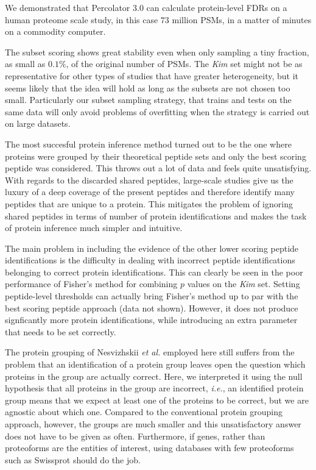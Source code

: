 \documentclass{article}
\begin{document}
We demonstrated that Percolator 3.0 can calculate protein-level FDRs
on a human proteome scale study, in this case $73$ million PSMs, in a
matter of minutes on a commodity computer.

The subset scoring shows great stability even when only sampling a
tiny fraction, as small as $0.1\%$, of the original number of PSMs.
The {\em Kim} set might not be as representative for other types of
studies that have greater heterogeneity, but it seems likely that the
idea will hold as long as the subsets are not chosen too small.
Particularly our subset sampling strategy, that trains and tests on
the same data will only avoid problems of overfitting when the
strategy is carried out on large datasets.

The most succesful protein inference method turned out to be the one
where proteins were grouped by their theoretical peptide sets and only
the best scoring peptide was considered. This throws out a lot of data
and feels quite unsatisfying. With regards to the discarded shared
peptides, large-scale studies give us the luxury of a deep coverage of
the present peptides and therefore identify many peptides that
are unique to a protein. This mitigates the problem of ignoring shared
peptides in terms of number of protein identifications and makes the
task of protein inference much simpler and intuitive.

The main problem in including the evidence of the other lower scoring
peptide identifications is the difficulty in dealing with incorrect
peptide identifications belonging to correct protein identifications.
This can clearly be seen in the poor performance of Fisher's method
for combining $p$ values on the {\em Kim} set. Setting
peptide-level thresholds can actually bring Fisher's method up to par
with the best scoring peptide approach (data not shown). However,
it does not produce signficantly more protein identifications,
while introducing an extra parameter that needs to be set correctly.

The protein grouping of Nesvizhskii {\em et al.} employed here still
suffers from the problem that an identification of a protein group
leaves open the question which proteins in the group are actually
correct. Here, we interpreted it using the null hypothesis that all
proteins in the group are incorrect, {\em i.e.}, an identified protein
group means that we expect at least one of the proteins to be correct,
but we are agnostic about which one. Compared to the conventional
protein grouping approach, however, the groups are much smaller and
this unsatisfactory answer does not have to be given as often.
Furthermore, if genes, rather than proteoforms are the entities of
interest, using databases with few proteoforms such as Swissprot
should do the job.
\end{document}
